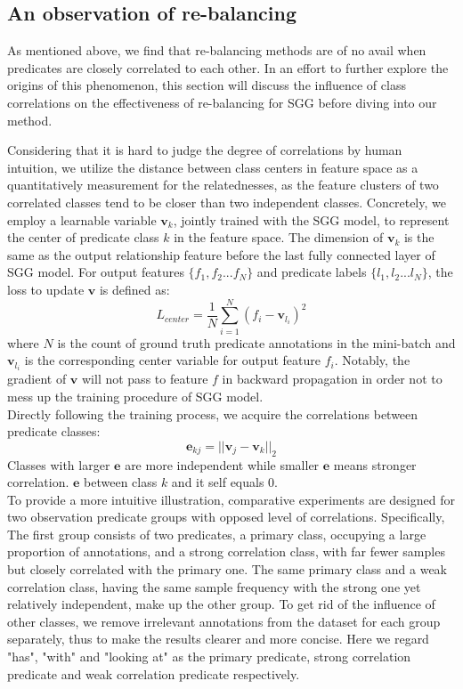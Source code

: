 \documentclass[sigconf]{acmart}
\begin{document}
\subsection{An observation of re-balancing}
As mentioned above, we find that re-balancing methods are of no avail when predicates are closely correlated to each other. In an effort to further explore the origins of this phenomenon, this section will discuss the influence of class correlations on the effectiveness of re-balancing for SGG before diving into our method.

Considering that it is hard to judge the degree of correlations by human intuition, we utilize the distance between class centers in feature space as a quantitatively measurement for the relatednesses, as the feature clusters of two correlated classes tend to be closer than two independent classes. Concretely, we employ a learnable variable ${\textbf{v}}_{k}$, jointly trained with the SGG model, to represent the center of predicate class $k$ in the feature space. The dimension of ${\textbf{v}}_{k}$ is the same as the output relationship feature before the last fully connected layer of SGG model. For output features $\{{f}_{1},{f}_{2}...{f}_{N}\}$ and predicate labels $\{{l}_{1},{l}_{2}...{l}_{N}\}$, the loss to update $\textbf{v}$ is defined as:
\begin{equation}\label{equ:Lcenter}
    L_{center}=\frac{1}{N}\sum_{i=1}^N({f}_{i} - {\textbf{v}}_{{l}_{i}})^2
\end{equation}
where $N$ is the count of ground truth predicate annotations in the mini-batch and ${\textbf{v}}_{{l}_{i}}$ is the corresponding center variable for output feature ${f}_{i}$.
Notably, the gradient of $\textbf{v}$ will not pass to feature ${f}$ in backward propagation in order not to mess up the training procedure of SGG model.
\\\indent Directly following the training process, we acquire the correlations between predicate classes:
\begin{equation}\label{equ:G}
    {\textbf{e}}_{kj}=||{\textbf{v}}_{j}-{\textbf{v}}_{k}||_2
\end{equation}
Classes with larger $\textbf{e}$ are more independent while smaller $\textbf{e}$ means stronger correlation. $\textbf{e}$ between class $k$ and it self equals 0.
\\\indent To provide a more intuitive illustration, comparative experiments are designed for two observation predicate groups with opposed level of correlations. Specifically, The first group consists of two predicates, a primary class, occupying a large proportion of annotations, and a strong correlation class, with far fewer samples but closely correlated with the primary one. The same primary class and a weak correlation class, having the same sample frequency with the strong one yet relatively independent, make up the other group. To get rid of the influence of other classes, we remove irrelevant annotations from the dataset for each group separately, thus to make the results clearer and more concise. Here we regard "has", "with" and "looking at" as the primary predicate, strong correlation predicate and weak correlation predicate respectively. 
\end{document}

